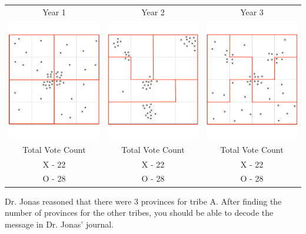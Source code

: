 \begin{tabular}{c c c }

Year 1 & Year 2 & Year 3 \\
 \includegraphics[width=2in]{assets/Gerrymandering/Gerry4x4-50-1Solution.pdf} &  \includegraphics[width=2in]{assets/Gerrymandering/Gerry4x4-50-2Solution.pdf} &  \includegraphics[width=2in]{assets/Gerrymandering/Gerry4x4-50-3Solution.pdf}\\
 Total Vote Count &  Total Vote Count &  Total Vote Count\\
 X - 22 & X - 22 & X  - 22\\
 O - 28 & O - 28 & O - 28
\end{tabular}

Dr. Jonas reasoned that there were 3 provinces for tribe A.
After finding the number of provinces for the other tribes, you should be able to decode the message in Dr. Jonas' journal.
